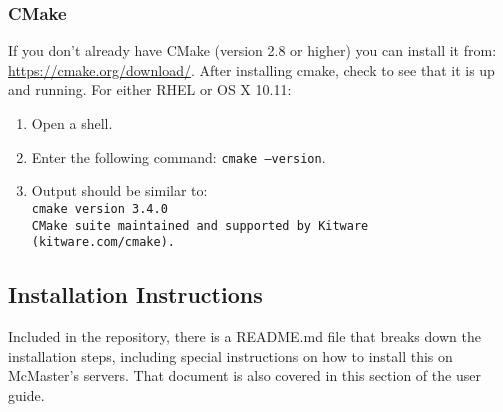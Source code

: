 \documentclass[12pt]{article}
\begin{document}
\subsubsection{CMake}
If you don't already have CMake (version 2.8 or higher) you can install it from: \url{https://cmake.org/download/}. After installing cmake, check to see that it is up and running. For either RHEL or OS X 10.11:
\begin{enumerate}
\item Open a shell.
\item Enter the following command: \texttt{cmake --version}.
\item Output should be similar to:\\
\texttt{cmake version 3.4.0}\\
\texttt{CMake suite maintained and supported by Kitware (kitware.com/cmake).}
\end{enumerate}

\subsection{Installation Instructions} %
Included in the repository, there is a README.md file that breaks down the installation steps, including special instructions on how to install this on McMaster's servers. That document is also covered in this section of the user guide.
\end{document}
